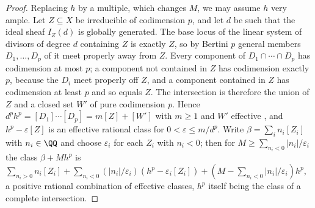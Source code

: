 \begin{proof}
Replacing $h$ by a multiple, which changes $M$, we may assume $h$ very ample.
Let $Z\subseteq X$ be irreducible of codimension $p$, and let $d$ be such that
the ideal sheaf $I_{Z}(d)$ is globally generated. The base locus of the linear
system of divisors of degree $d$ containing $Z$ is exactly $Z$, so by Bertini
$p$ general members $D_{1},\dots,D_{p}$ of it meet properly away from $Z$.
Every component of $D_{1}\cap\cdots\cap D_{p}$ has codimension at most $p$;
a component not contained in $Z$ has codimension exactly $p$, because the
$D_{i}$ meet properly off $Z$, and a component contained in $Z$ has
codimension at least $p$ and so equals $Z$. The intersection is therefore the
union of $Z$ and a closed set $W'$ of pure codimension $p$. Hence $d^{p}h^{p}=[D_{1}]\cdots[D_{p}]=m[Z]+[W']$ with $m\ge1$ and
$W'$ effective \cite[Chapter~7]{Ful98}, and $h^{p}-\varepsilon[Z]$ is an
effective rational class for $0<\varepsilon\le m/d^{p}$. Write
$\beta=\sum_{i}n_{i}[Z_{i}]$ with $n_{i}\in\QQ$ and choose $\varepsilon_{i}$ for
each $Z_{i}$ with $n_{i}<0$; then for $M\ge\sum_{n_{i}<0}|n_{i}|/\varepsilon_{i}$
the class $\beta+Mh^{p}$ is $\sum_{n_{i}>0}n_{i}[Z_{i}]+\sum_{n_{i}<0}
(|n_{i}|/\varepsilon_{i})(h^{p}-\varepsilon_{i}[Z_{i}])+(M-\sum_{n_{i}<0}
|n_{i}|/\varepsilon_{i})h^{p}$, a positive rational combination of effective
classes, $h^{p}$ itself being the class of a complete intersection.
\end{proof}

